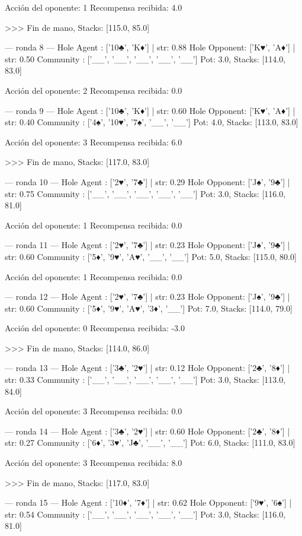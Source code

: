 Acción del oponente: 1
Recompensa recibida: 4.0

>>> Fin de mano, Stacks: [115.0, 85.0]


--- ronda 8 ---
Hole Agent : ['10♣', 'K♦'] | str: 0.88
Hole Opponent: ['K♥', 'A♦'] | str: 0.50
Community  : ['__', '__', '__', '__', '__']
Pot: 3.0, Stacks: [114.0, 83.0]

Acción del oponente: 2
Recompensa recibida: 0.0

--- ronda 9 ---
Hole Agent : ['10♣', 'K♦'] | str: 0.60
Hole Opponent: ['K♥', 'A♦'] | str: 0.40
Community  : ['4♠', '10♥', '7♠', '__', '__']
Pot: 4.0, Stacks: [113.0, 83.0]

Acción del oponente: 3
Recompensa recibida: 6.0

>>> Fin de mano, Stacks: [117.0, 83.0]


--- ronda 10 ---
Hole Agent : ['2♥', '7♣'] | str: 0.29
Hole Opponent: ['J♠', '9♣'] | str: 0.75
Community  : ['__', '__', '__', '__', '__']
Pot: 3.0, Stacks: [116.0, 81.0]

Acción del oponente: 1
Recompensa recibida: 0.0

--- ronda 11 ---
Hole Agent : ['2♥', '7♣'] | str: 0.23
Hole Opponent: ['J♠', '9♣'] | str: 0.60
Community  : ['5♦', '9♥', 'A♥', '__', '__']
Pot: 5.0, Stacks: [115.0, 80.0]

Acción del oponente: 1
Recompensa recibida: 0.0

--- ronda 12 ---
Hole Agent : ['2♥', '7♣'] | str: 0.23
Hole Opponent: ['J♠', '9♣'] | str: 0.60
Community  : ['5♦', '9♥', 'A♥', '3♦', '__']
Pot: 7.0, Stacks: [114.0, 79.0]

Acción del oponente: 0
Recompensa recibida: -3.0

>>> Fin de mano, Stacks: [114.0, 86.0]


--- ronda 13 ---
Hole Agent : ['3♣', '2♥'] | str: 0.12
Hole Opponent: ['2♣', '8♦'] | str: 0.33
Community  : ['__', '__', '__', '__', '__']
Pot: 3.0, Stacks: [113.0, 84.0]

Acción del oponente: 3
Recompensa recibida: 0.0

--- ronda 14 ---
Hole Agent : ['3♣', '2♥'] | str: 0.60
Hole Opponent: ['2♣', '8♦'] | str: 0.27
Community  : ['6♦', '3♥', 'J♣', '__', '__']
Pot: 6.0, Stacks: [111.0, 83.0]

Acción del oponente: 3
Recompensa recibida: 8.0

>>> Fin de mano, Stacks: [117.0, 83.0]


--- ronda 15 ---
Hole Agent : ['10♦', '7♦'] | str: 0.62
Hole Opponent: ['9♥', '6♠'] | str: 0.54
Community  : ['__', '__', '__', '__', '__']
Pot: 3.0, Stacks: [116.0, 81.0]

